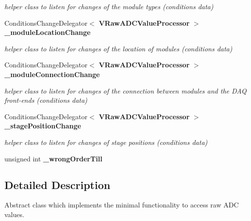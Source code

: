 \begin{DoxyCompactItemize}
\begin{DoxyCompactList}\small\item\em helper class to listen for changes of the module types (conditions data) \item\end{DoxyCompactList}\item 
ConditionsChangeDelegator$<$ {\bf VRawADCValueProcessor} $>$ {\bf \_\-moduleLocationChange}\label{classCALICE_1_1VRawADCValueProcessor_af8355db99526cb3be8df7d5b0057a1ea}

\begin{DoxyCompactList}\small\item\em helper class to listen for changes of the location of modules (conditions data) \item\end{DoxyCompactList}\item 
ConditionsChangeDelegator$<$ {\bf VRawADCValueProcessor} $>$ {\bf \_\-moduleConnectionChange}\label{classCALICE_1_1VRawADCValueProcessor_a854695da8e7fe2c647ac8415367987d5}

\begin{DoxyCompactList}\small\item\em helper class to listen for changes of the connection between modules and the DAQ front-\/ends (conditions data) \item\end{DoxyCompactList}\item 
ConditionsChangeDelegator$<$ {\bf VRawADCValueProcessor} $>$ {\bf \_\-stagePositionChange}\label{classCALICE_1_1VRawADCValueProcessor_a9aec2fb84d7a380d73995bf3d21205b9}

\begin{DoxyCompactList}\small\item\em helper class to listen for changes of stage positions (conditions data) \item\end{DoxyCompactList}\item 
unsigned int {\bfseries \_\-wrongOrderTill}\label{classCALICE_1_1VRawADCValueProcessor_ac89301a31fbc0418b25ebd3c7c3680f9}

\end{DoxyCompactItemize}


\subsection{Detailed Description}
Abstract class which implements the minimal functionality to access raw ADC values. 

